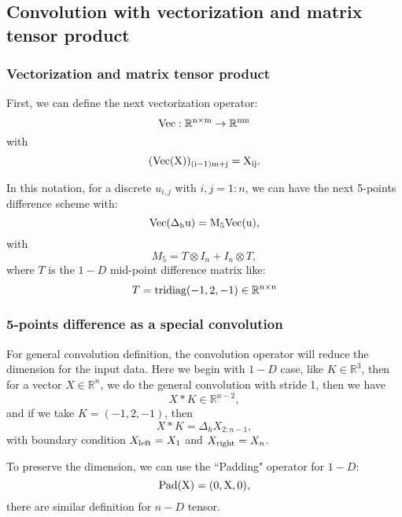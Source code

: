 \subsection{Convolution with vectorization and matrix tensor product}
\subsubsection{Vectorization and matrix tensor product}
First, we can define the next vectorization operator:
\begin{equation}
\rm{Vec}: \mathbb{R}^{n \times m} \to \mathbb{R}^{nm}
\end{equation}
with 
\begin{equation}
(\rm{Vec}(X))_{(i-1)m + j} = X_{ij}.
\end{equation}

In this notation, for a discrete $u_{i,j}$ with $ i, j = 1:n$, we can have the next 5-points difference scheme with:
\begin{equation}
\rm{Vec}(\Delta_h u) = M_5 \rm{Vec}(u),
\end{equation}
with 
\begin{equation}
M_5 = T\otimes I_{n} + I_{n} \otimes T,
\end{equation}
where $T$ is the $1-D$ mid-point difference matrix like: 
\begin{equation}
T = \rm{tridiag}(-1,2,-1) \in \mathbb{R}^{n \times n}
\end{equation}

\subsubsection{5-points difference as a special convolution}
For general convolution definition, the convolution operator will reduce the dimension for the input data. Here we begin with $1-D$ case, like $K \in \mathbb{R}^{3}$, then for a vector $X \in \mathbb{R}^n$, we do the general convolution with stride 1, then we have 
\begin{equation}
X \ast K \in \mathbb{R}^{n-2},
\end{equation}
and if we take $K = (-1, 2, -1)$, then
\begin{equation}
X \ast K = \Delta_h X_{2:n-1},
\end{equation}
with boundary condition $X_{\rm{left}} = X_1$ and $X_{\rm{right}} = X_n$.  

To preserve the dimension, we can use the ``Padding" operator for $1-D$:
\begin{equation}
\rm{Pad}(X) = (0, X, 0),
\end{equation}
there are similar definition for $n-D$ tensor. 

